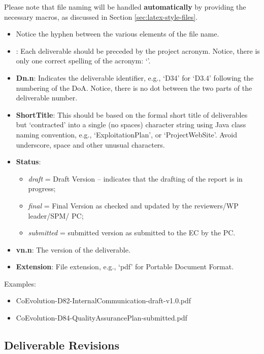 Please note that file naming will be handled \textbf{automatically} by providing the necessary macros, as discussed in Section \ref{sec:latex-style-files}.

\begin{itemize}
	\item Notice the hyphen between the various elements of the file name.
    \item {\bf \hyperride{}}: Each \hyperride{} deliverable should be preceded by the project acronym. Notice, there is only one correct spelling of the acronym: ‘\hyperride{}’. 
    \item {\bf Dn.n}: Indicates the deliverable identifier, e.g., ‘D34’ for ‘D3.4’ following the numbering of the \ac{DoA}. Notice, there is no dot between the two parts of the deliverable number.
    \item {\bf ShortTitle}: This should be based on the formal short title of deliverables but ‘contracted’ into a single (no spaces) character string using Java class naming convention, e.g., ‘ExploitationPlan’,  or ‘ProjectWebSite’. Avoid underscore, space and other unusual characters.
	\item {\bf Status}: 
	\begin{itemize}
		\item \textit{draft} = Draft Version – indicates that the drafting of the report is in progress; 
		\item \textit{final} = Final Version as checked and updated by the reviewers/WP leader/SPM/ PC; 
		\item \textit{submitted} = submitted version as submitted to the EC by the PC.
	\end{itemize}
	\item {\bf vn.n}: The version of the deliverable. 
    \item {\bf Extension}: File extension, e.g., ‘pdf’ for Portable Document Format. 
\end{itemize}

Examples:

\begin{itemize}
    \item CoEvolution-D82-InternalCommunication-draft-v1.0.pdf
    \item CoEvolution-D84-QualityAssurancePlan-submitted.pdf
\end{itemize}



\subsection{Deliverable Revisions}
\label{sec:change-log}

